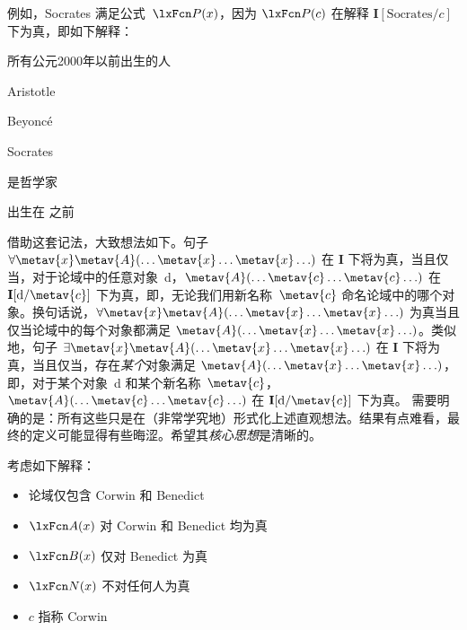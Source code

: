 例如，Socrates 满足公式~$\atom{P}{x}$，因为 $\atom{P}{c}$ 在解释 $\mathbf{I}[\text{Socrates}/c]$ 下为真，即如下解释：

\begin{ekey}
	\item[\text{论域}] 所有公元2000年以前出生的人
	\item[a] Aristotle
	\item[b] Beyoncé
	\item[c] Socrates
	\item[\atom{P}{x}]  是哲学家
	\item[\atom{R}{x,y}]  出生在  之前
\end{ekey}

借助这套记法，大致想法如下。句子 $\forall \metav{x}\metav{A}(\ldots \metav{x} \ldots \metav{x} \ldots)$ 在 $\mathbf{I}$ 下将为真，当且仅当，对于论域中的任意对象~d，$\metav{A}(\ldots \metav{c} \ldots \metav{c}\ldots)$ 在 $\mathbf{I}[\text{d}/\metav{c}]$ 下为真，即，无论我们用新名称~$\metav{c}$ 命名论域中的哪个对象。换句话说，$\forall \metav{x} \metav{A}(\ldots \metav{x} \ldots \metav{x}
\ldots)$ 为真当且仅当论域中的每个对象都满足 $\metav{A}(\ldots \metav{x} \ldots \metav{x} \ldots)$。类似地，句子 $\exists \metav{x}\metav{A}(\ldots \metav{x} \ldots \metav{x}
\ldots)$ 在 $\mathbf{I}$ 下将为真，当且仅当，存在\emph{某个}对象满足 $\metav{A}(\ldots \metav{x} \ldots \metav{x}
\ldots)$，即，对于某个对象~d 和某个新名称~$\metav{c}$，$\metav{A}(\ldots \metav{c} \ldots \metav{c} \ldots)$ 在 $\mathbf{I}[\text{d}/\metav{c}]$ 下为真。
需要明确的是：所有这些只是在（非常学究地）形式化上述直观想法。结果有点难看，最终的定义可能显得有些晦涩。希望其\emph{核心思想}是清晰的。

\practiceproblems
\solutions
\problempart
\label{pr.TorF1}
考虑如下解释：


\begin{itemize}
		\item 论域仅包含 Corwin 和 Benedict
		\item $\atom{A}{x}$ 对 Corwin 和 Benedict 均为真
		\item $\atom{B}{x}$ 仅对 Benedict 为真
		\item $\atom{N}{x}$ 不对任何人为真
		\item $c$ 指称 Corwin
	\end{itemize}


